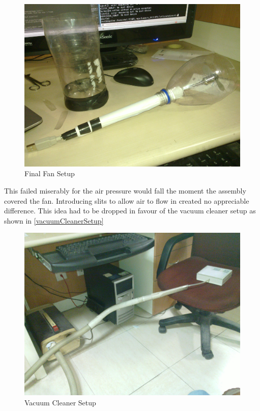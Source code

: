 \begin{enumerate}
					\begin{figure}[bth]
						\begin{center}
							\includegraphics[width=0.7\linewidth]{gfx/fanSetupActual.jpg}
						\end{center}
					\caption[Final Fan Setup]{Final Fan Setup}
					\label{fanSetupActual}
					\end{figure}
					This failed miserably for the air pressure would fall the moment the assembly covered the fan. Introducing slits to allow air to flow in created no appreciable difference. This idea had to be dropped in favour of the vacuum cleaner setup as shown in \autoref{vacuumCleanerSetup}
					\begin{figure}[bth]
						\begin{center}
							\includegraphics[width=0.7\linewidth]{gfx/vacuumCleanerSetup.jpg}
						\end{center}
					\caption[Vacuum Cleaner Setup]{Vacuum Cleaner Setup}
					\label{vacuumCleanerSetup}
					\end{figure}					 
					\par

\end{enumerate}

